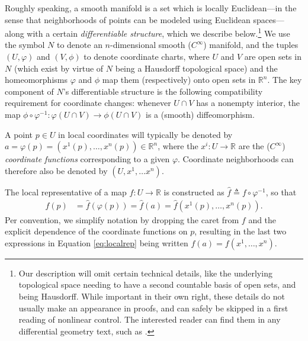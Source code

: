 \documentclass[psamsfonts]{amsart}
\theoremstyle{definition}
\theoremstyle{remark}
\newcommand*\R{\mathds{R}}
\numberwithin{equation}{section}
\begin{document}
Roughly speaking, a smooth manifold is a set which is locally Euclidean---in the sense that neighborhoods of points can be modeled using Euclidean spaces---along with a certain \textit{differentiable structure}, which we describe below.\footnote{Our description will omit certain technical details, like the underlying topological space needing to have a second countable basis of open sets, and being Hausdorff. While important in their own right, these details do not usually make an appearance in proofs, and can safely be skipped in a first reading of nonlinear control. The interested reader can find them in any differential geometry text, such as \cite{abraham_manifolds_1988}.} We use the symbol $N$ to denote an $n$-dimensional smooth ($C^{\infty}$) manifold, and the tuples $(U, \varphi)$ and $(V, \phi)$ to denote coordinate charts, where $U$ and $V$ are open sets in $N$ (which exist by virtue of $N$ being a Hausdorff topological space) and the homeomorphisms $\varphi$ and $\phi$ map them (respectively) onto open sets in $\R^n$. The key component of $N$'s differentiable structure is the following compatibility requirement for coordinate changes: whenever $U \cap V$ has a nonempty interior, the map $\phi\circ\varphi^{-1}: \varphi(U\cap V) \rightarrow \phi(U\cap V)$ is a (smooth) diffeomorphism. %

A point $p\in U$ in local coordinates will typically be denoted by $a = \varphi (p) = (x^1(p), \dots, x^n(p)) \in \R^n$, where the $x^i: U \rightarrow \R$ are the ($C^{\infty}$) \textit{coordinate functions} corresponding to a given $\varphi$. Coordinate neighborhoods can therefore also be denoted by $(U, x^1, \dots x^n)$. 

The local representative of a map $f:U\rightarrow \R$ is constructed as $\hat f \triangleq f\circ \varphi^{-1}$, so that 
\begin{align}\label{eq:localrep}
f(p) & = \hat f(\varphi(p)) =\hat f(a) = \hat f(x^1(p), \dots, x^n(p)).
\end{align}
Per convention, we simplify notation by dropping the caret from $f$ and the explicit dependence of the coordinate functions on $p$, resulting in the last two expressions in Equation \ref{eq:localrep} being written $f(a) = f(x^1, \dots, x^n)$. 
\end{document}
